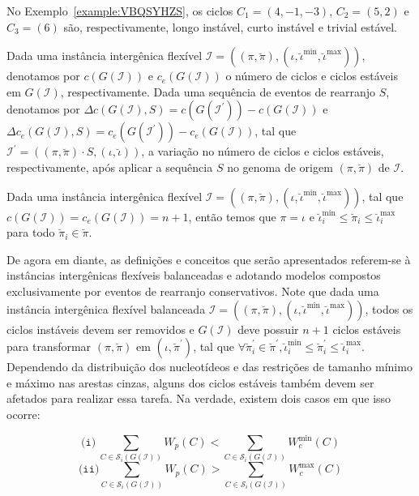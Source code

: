 

No Exemplo~\ref{example:VBQSYHZS}, os ciclos $C_1=(4,-1,-3)$, $C_2 = (5,2)$ e $C_3 = (6)$ são, respectivamente, longo instável, curto instável e trivial estável.

Dada uma instância intergênica flexível $\mathcal{I} = ((\pi,\breve\pi),(\iota,\breve\iota^{\min},\breve\iota^{\max}))$, denotamos por $c(G(\mathcal{I}))$ e $c_e(G(\mathcal{I}))$ o número de ciclos e ciclos estáveis em $G(\mathcal{I})$, respectivamente. Dada uma sequência de eventos de rearranjo $S$, denotamos por $\Delta c(G(\mathcal{I}), S) = c(G(\mathcal{I^{\prime}})) - c(G(\mathcal{I}))$ e $\Delta c_e(G(\mathcal{I}), S) = c_e(G(\mathcal{I^{\prime}})) - c_e(G(\mathcal{I}))$, tal que $\mathcal{I^{\prime}} = ((\pi,\breve\pi) \cdot S,(\iota,\breve\iota))$, a variação no número de ciclos e ciclos estáveis, respectivamente, após aplicar a sequência $S$ no genoma de origem $(\pi,\breve\pi)$ de $\mathcal{I}$.

\begin{remark}\label{remark:IRNWKUZA}
Dada uma instância intergênica flexível $\mathcal{I} = ((\pi,\breve\pi),(\iota,\breve\iota^{\min},\breve\iota^{\max}))$, tal que $c(G(\mathcal{I})) = c_e(G(\mathcal{I})) = n+1$, então temos que $\pi = \iota$ e $\breve\iota^{\min}_i \le \breve\pi_i \le \breve\iota^{\max}_i$ para todo $\breve\pi_i \in \breve\pi$.
\end{remark}

De agora em diante, as definições e conceitos que serão apresentados referem-se à instâncias intergênicas flexíveis balanceadas e adotando modelos compostos exclusivamente por eventos de rearranjo conservativos. Note que dada uma instância intergênica flexível balanceada $\mathcal{I} = ((\pi,\breve\pi),(\iota,\breve\iota^{\min},\breve\iota^{\max}))$, todos os ciclos instáveis devem ser removidos e $G(\mathcal{I})$ deve possuir $n+1$ ciclos estáveis para transformar $(\pi,\breve\pi)$ em $(\iota,\breve\pi^{\prime})$, tal que $\forall \breve\pi^{\prime}_i \in \breve\pi^{\prime}, \breve\iota^{\min}_i \le \breve\pi^{\prime}_i \le \breve\iota^{\max}_i$. Dependendo da distribuição dos nucleotídeos e das restrições de tamanho mínimo e máximo nas arestas cinzas, alguns dos ciclos estáveis também devem ser afetados para realizar essa tarefa. Na verdade, existem dois casos em que isso ocorre:

$$\texttt{(i)}~\sum_{C \in \mathcal{S}_i(G(\mathcal{I}))} W_p(C) < \sum_{C \in \mathcal{S}_i(G(\mathcal{I}))} W^{\min}_c(C)$$
$$\texttt{(ii)}\sum_{C \in \mathcal{S}_i(G(\mathcal{I}))} W_p(C) > \sum_{C \in \mathcal{S}_i(G(\mathcal{I}))} W^{\max}_c(C)$$

